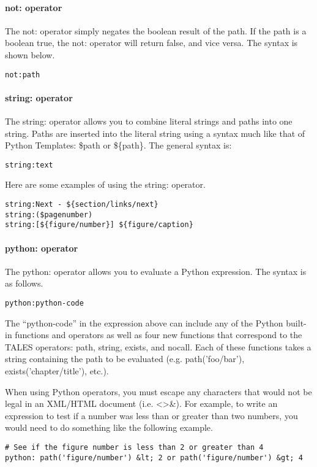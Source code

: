 \paragraph{not: operator}

The not: operator simply negates the boolean result of the path.  If
the path is a boolean true, the not: operator will return false, and
vice versa.  The syntax is shown below.
\begin{verbatim}
not:path
\end{verbatim}


\paragraph{string: operator}

The string: operator allows you to combine literal strings and paths
into one string.  Paths are inserted into the literal string using a
syntax much like that of Python Templates: \$path or \$\{path\}.
The general syntax is:
\begin{verbatim}
string:text
\end{verbatim}

Here are some examples of using the string: operator.
\begin{verbatim}
string:Next - ${section/links/next}
string:($pagenumber)
string:[${figure/number}] ${figure/caption}
\end{verbatim}


\paragraph{python: operator}

The python: operator allows you to evaluate a Python expression.  The
syntax is as follows.
\begin{verbatim}
python:python-code
\end{verbatim}

The ``python-code'' in the expression above can include any of the Python
built-in functions and operators as well as four new functions that
correspond to the TALES operators: path, string, exists, and nocall.
Each of these functions takes a string containing the path to be 
evaluated (e.g. path('foo/bar'), exists('chapter/title'), etc.).

When using Python operators, you must escape any characters that would
not be legal in an XML/HTML document (i.e. <>\&).  For example, 
to write an expression to test if a number was less than or greater than
two numbers, you would need to do something like the following example.
\begin{verbatim}
# See if the figure number is less than 2 or greater than 4
python: path('figure/number') &lt; 2 or path('figure/number') &gt; 4
\end{verbatim}


